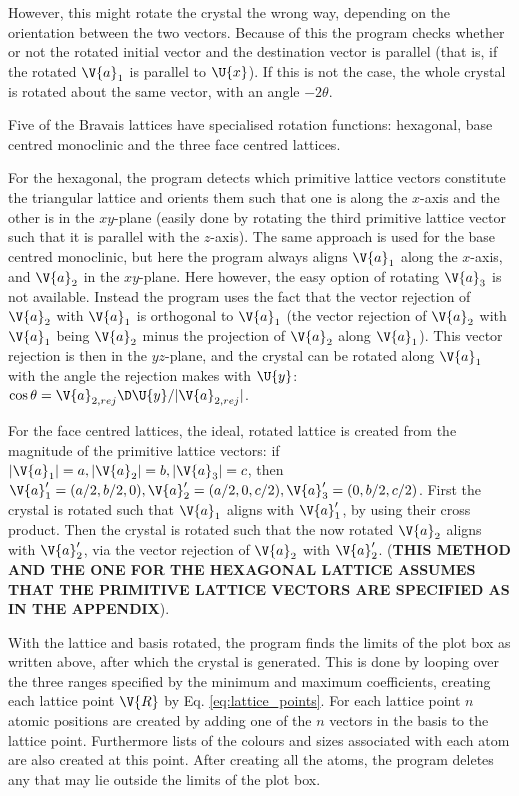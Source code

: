 \documentclass[main.tex]{subfiles}
\begin{document}
	However, this might rotate the crystal the wrong way, depending on the orientation between the two vectors. Because of this the program checks whether or not the rotated initial vector and the destination vector is parallel (that is, if the rotated $ \V{a}_1 $ is parallel to $ \U{x} $). If this is not the case, the whole crystal is rotated about the same vector, with an angle $ -2\theta $.
	
	Five of the Bravais lattices have specialised rotation functions: hexagonal, base centred monoclinic and the three face centred lattices.
	
	For the hexagonal, the program detects which primitive lattice vectors constitute the triangular lattice and orients them such that one is along the $ x $-axis and the other is in the $ xy $-plane (easily done by rotating the third primitive lattice vector such that it is parallel with the $ z $-axis). The same approach is used for the base centred monoclinic, but here the program always aligns $ \V{a}_1 $ along the $ x $-axis, and $ \V{a}_2 $ in the $ xy $-plane. Here however, the easy option of rotating $ \V{a}_3 $ is not available. Instead the program uses the fact that the vector rejection of $ \V{a}_2 $ with $ \V{a}_1 $ is orthogonal to $ \V{a}_1 $ (the vector rejection of $ \V{a}_2 $ with $ \V{a}_1 $ being $ \V{a}_2 $ minus the projection of $ \V{a}_2 $ along $ \V{a}_1 $). This vector rejection is then in the $ yz $-plane, and the crystal can be rotated along $ \V{a}_1 $ with the angle the rejection makes with $ \U{y} $: $ \cos \theta = \V{a}_{2,rej} \D \U{y} / |\V{a}_{2,rej}|$.
	
	For the face centred lattices, the ideal, rotated lattice is created from the magnitude of the primitive lattice vectors: if $ |\V{a}_1| = a, |\V{a}_2| = b, |\V{a}_3| = c $, then $ \V{a}'_1 = (a/2, b/2, 0), \V{a}'_2 = (a/2, 0, c/2), \V{a}'_3 = (0, b/2, c/2) $. First the crystal is rotated such that $ \V{a}_1 $ aligns with $ \V{a}'_1 $, by using their cross product. Then the crystal is rotated such that the now rotated $ \V{a}_2 $ aligns with $ \V{a}'_2 $, via the vector rejection of $ \V{a}_2 $ with $ \V{a}'_2 $. (\textbf{THIS METHOD AND THE ONE FOR THE HEXAGONAL LATTICE ASSUMES THAT THE PRIMITIVE LATTICE VECTORS ARE SPECIFIED AS IN THE APPENDIX}).
	
	With the lattice and basis rotated, the program finds the limits of the plot box as written above, after which the crystal is generated. This is done by looping over the three ranges specified by the minimum and maximum coefficients, creating each lattice point $ \V{R} $ by Eq. \eqref{eq:lattice_points}. For each lattice point $ n $ atomic positions are created by adding one of the $ n $ vectors in the basis to the lattice point. Furthermore lists of the colours and sizes associated with each atom are also created at this point. After creating all the atoms, the program deletes any that may lie outside the limits of the plot box.
	
\end{document}
